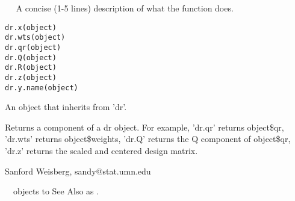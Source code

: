 \begin{Description}\relax
~~ A concise (1-5 lines) description of what the function does. ~~
\end{Description}
\begin{Usage}
\begin{verbatim}
dr.x(object)
dr.wts(object) 
dr.qr(object)
dr.Q(object)
dr.R(object)
dr.z(object) 
dr.y.name(object) 
\end{verbatim}
\end{Usage}
\begin{Arguments}
\begin{ldescription}
\item[\code{object}] An object that inherits from 'dr'. 
\end{ldescription}
\end{Arguments}
\begin{Value}
Returns a component of a dr object.  For example, 'dr.qr' returns object\$qr,
'dr.wts' returns object\$weights, 'dr.Q' returns the Q component of object\$qr,
'dr.z' returns the scaled and centered design matrix.
\end{Value}
\begin{Author}\relax
Sanford Weisberg, sandy@stat.umn.edu
\end{Author}
\begin{SeeAlso}\relax
~~objects to See Also as .
\end{SeeAlso}
\begin{Examples}
\end{Examples}

